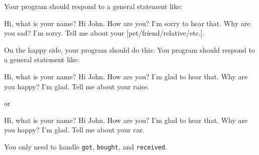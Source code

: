 Your program should respond to a general statement like:
\begin{console}[fontsize=\small,frame=single,commandchars=\\\{\}]
Hi, what is your name?
Hi John. How are you?
I'm sorry to hear that. Why are you  sad?
I'm sorry. Tell me about your [pet/friend/relative/etc.].
\end{console}

On the happy side, your program should do this:
You program should respond to a general statement like:
\begin{console}[fontsize=\small,frame=single,commandchars=\\\{\}]
Hi, what is your name?
Hi John. How are you?
I'm glad to hear that. Why are you  happy?
I'm glad. Tell me about your raise.
\end{console}
or
\begin{console}[fontsize=\small,frame=single,commandchars=\\\{\}]
Hi, what is your name?
Hi John. How are you?
I'm glad to hear that. Why are you  happy?
I'm glad. Tell me about your car.
\end{console}

You only need to handle
\verb!got!,
\verb!bought!, and 
\verb!received!.
